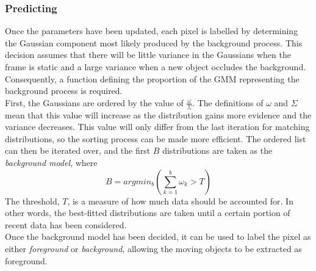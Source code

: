 \subsubsection{Predicting}
\indent \indent
Once the parameters have been updated, each pixel is labelled by determining the Gaussian component most likely produced by the background process. This decision assumes that there will be little variance in the Gaussians when the frame is static and a large variance when a new object occludes the background. Consequently, a function defining the proportion of the GMM representing the background process is required.
\smallskip \\ \indent
First, the Gaussians are ordered by the value of $\frac{\omega}{\Sigma}$. The definitions of $\omega$ and $\Sigma$ mean that this value will increase as the distribution gains more evidence and the variance decreases. This value will only differ from the last iteration for matching distributions, so the sorting process can be made more efficient. The ordered list can then be iterated over, and the first $B$ distributions are taken as the \textit{background model}, where 
\begin{equation}
    \label{eq:gmmInequality}
    B = argmin_b \left( \sum^b_{k=1} \omega_k > T \right)
\end{equation}
The threshold, $T$, is a measure of how much data should be accounted for. In other words, the best-fitted distributions are taken until a certain portion of recent data has been considered. 
\smallskip \\ \indent
Once the background model has been decided, it can be used to label the pixel as either \textit{foreground} or \textit{background}, allowing the moving objects to be extracted as foreground.
